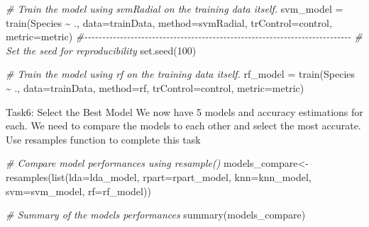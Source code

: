 \documentclass[
]{article}
\newenvironment{Shaded}{\begin{snugshade}}{\end{snugshade}}
\newcommand{\AttributeTok}[1]{\textcolor[rgb]{0.77,0.63,0.00}{#1}}
\newcommand{\CommentTok}[1]{\textcolor[rgb]{0.56,0.35,0.01}{\textit{#1}}}
\newcommand{\DecValTok}[1]{\textcolor[rgb]{0.00,0.00,0.81}{#1}}
\newcommand{\FunctionTok}[1]{\textcolor[rgb]{0.00,0.00,0.00}{#1}}
\newcommand{\NormalTok}[1]{#1}
\newcommand{\OtherTok}[1]{\textcolor[rgb]{0.56,0.35,0.01}{#1}}
\newcommand{\SpecialCharTok}[1]{\textcolor[rgb]{0.00,0.00,0.00}{#1}}
\newcommand{\StringTok}[1]{\textcolor[rgb]{0.31,0.60,0.02}{#1}}
\begin{document}
\begin{Shaded}
\begin{Highlighting}[]
\CommentTok{\# Train the model using svmRadial on the training data itself.}
\NormalTok{svm\_model }\OtherTok{=} \FunctionTok{train}\NormalTok{(Species }\SpecialCharTok{\textasciitilde{}}\NormalTok{ ., }\AttributeTok{data=}\NormalTok{trainData, }\AttributeTok{method=}\StringTok{\textquotesingle{}svmRadial\textquotesingle{}}\NormalTok{, }\AttributeTok{trControl=}\NormalTok{control, }\AttributeTok{metric=}\NormalTok{metric)}
\CommentTok{\#{-}{-}{-}{-}{-}{-}{-}{-}{-}{-}{-}{-}{-}{-}{-}{-}{-}{-}{-}{-}{-}{-}{-}{-}{-}{-}{-}{-}{-}{-}{-}{-}{-}{-}{-}{-}{-}{-}{-}{-}{-}{-}{-}{-}{-}{-}{-}{-}{-}{-}{-}{-}{-}{-}{-}{-}{-}{-}{-}{-}{-}{-}{-}{-}{-}{-}{-}{-}{-}{-}{-}{-}{-}{-}{-}}
\CommentTok{\# Set the seed for reproducibility}
\FunctionTok{set.seed}\NormalTok{(}\DecValTok{100}\NormalTok{)}

\CommentTok{\# Train the model using rf on the training data itself.}
\NormalTok{rf\_model }\OtherTok{=} \FunctionTok{train}\NormalTok{(Species }\SpecialCharTok{\textasciitilde{}}\NormalTok{ ., }\AttributeTok{data=}\NormalTok{trainData, }\AttributeTok{method=}\StringTok{\textquotesingle{}rf\textquotesingle{}}\NormalTok{, }\AttributeTok{trControl=}\NormalTok{control, }\AttributeTok{metric=}\NormalTok{metric)}
\end{Highlighting}
\end{Shaded}

Task6: Select the Best Model We now have 5 models and accuracy
estimations for each. We need to compare the models to each other and
select the most accurate. Use resamples function to complete this task

\begin{Shaded}
\begin{Highlighting}[]
\CommentTok{\# Compare model performances using resample()}
\NormalTok{models\_compare}\OtherTok{\textless{}{-}}\FunctionTok{resamples}\NormalTok{(}\FunctionTok{list}\NormalTok{(}\AttributeTok{lda=}\NormalTok{lda\_model, }\AttributeTok{rpart=}\NormalTok{rpart\_model, }\AttributeTok{knn=}\NormalTok{knn\_model, }\AttributeTok{svm=}\NormalTok{svm\_model, }\AttributeTok{rf=}\NormalTok{rf\_model))}

\CommentTok{\# Summary of the models performances}
\FunctionTok{summary}\NormalTok{(models\_compare)}
\end{Highlighting}
\end{Shaded}
\end{document}
